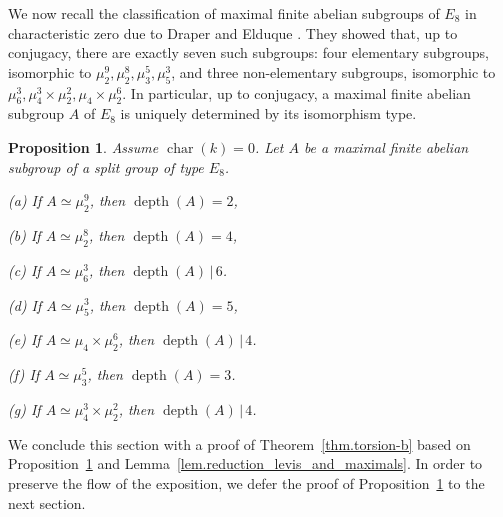 \documentclass[12pt]{amsart}
\numberwithin{equation}{section}
\newtheorem{proposition}[theorem]{Proposition}
\theoremstyle{remark}
\newcommand{\Char}{\operatorname{char}}
\newcommand{\depth}{\operatorname{depth}}
\begin{document}
We now recall the classification of maximal finite abelian subgroups of $E_8$ in characteristic zero due to Draper and Elduque \cite{draper2017maximal}. They showed that, up to conjugacy, there are exactly seven such subgroups: four elementary subgroups, isomorphic to $\mu_2^9,\mu_2^8,\mu_3^5, \mu_5^3$, and three non-elementary subgroups, isomorphic to $\mu_6^3,\mu_4^3\times \mu_2^2, \mu_4\times \mu_2^6$. In particular, up to conjugacy, a maximal finite abelian subgroup $A$ of $E_8$ is uniquely determined by its isomorphism type.

\begin{proposition} \label{prop.torsion-d} Assume $\Char(k)=0$. Let $A$ be a maximal finite abelian subgroup of a split group of type $E_8$. 

\smallskip
(a) If $A \simeq \mu_2^9$, then $\depth(A) = 2$,

\smallskip
(b) If $A \simeq \mu_2^8$, then $\depth(A) = 4$,

\smallskip
(c) If $A \simeq \mu_6^3$, then $\depth(A) \, | \, 6$.

\smallskip
(d) If $A \simeq \mu_5^3$, then $\depth(A) = 5$,

\smallskip
(e) If $A \simeq \mu_4\times \mu_2^6$, then $\depth(A) \, | \, 4$.

\smallskip
(f) If $A \simeq \mu_3^5$, then $\depth(A) = 3$.

\smallskip
(g) If $A \simeq \mu_4^3 \times \mu_2^2$, then $\depth(A) \, | \, 4$.
\end{proposition}

We conclude this section with a proof of Theorem~\ref{thm.torsion-b} based on Proposition~\ref{prop.torsion-d} and Lemma~\ref{lem.reduction_levis_and_maximals}.
In order to preserve the flow of the exposition, 
we defer the proof of Proposition~\ref{prop.torsion-d} to the next section. 
\end{document}
